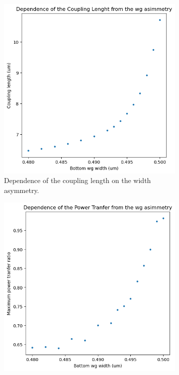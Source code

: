 \begin{figure}[H]
    \centering
    \vfill
    \begin{subfigure}[b]{0.48\linewidth}
        \centering
        \includegraphics[width=\linewidth]{Figures/wg_coupling_vs_asymm.png}
        \caption{Dependence of the coupling length on the width asymmetry.}
        \label{fig:wg_coupling_vs_asymm}
    \end{subfigure}
    \hfill
    \begin{subfigure}[b]{0.48\linewidth}
        \centering
        \includegraphics[width=\linewidth]{Figures/wg_power_vs_asymm.png}

\end{subfigure}
\end{figure}
